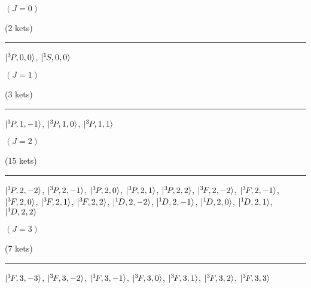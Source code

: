 \begin{mdframed}
\begin{center}
$(J=0)$

(2 kets)
\vspace{0.25cm}
\hrule
\vspace{0.25cm}
$|{}^{3}{\kern-0.1em}{P},0,0\rangle$, $|{}^{1}{\kern-0.1em}{S},0,0\rangle$
\end{center}
\end{mdframed}

\begin{mdframed}
\begin{center}
$(J=1)$

(3 kets)
\vspace{0.25cm}
\hrule
\vspace{0.25cm}
$|{}^{3}{\kern-0.1em}{P},1,-1\rangle$, $|{}^{3}{\kern-0.1em}{P},1,0\rangle$, $|{}^{3}{\kern-0.1em}{P},1,1\rangle$
\end{center}
\end{mdframed}

\begin{mdframed}
\begin{center}
$(J=2)$

(15 kets)
\vspace{0.25cm}
\hrule
\vspace{0.25cm}
$|{}^{3}{\kern-0.1em}{P},2,-2\rangle$, $|{}^{3}{\kern-0.1em}{P},2,-1\rangle$, $|{}^{3}{\kern-0.1em}{P},2,0\rangle$, $|{}^{3}{\kern-0.1em}{P},2,1\rangle$, $|{}^{3}{\kern-0.1em}{P},2,2\rangle$, $|{}^{3}{\kern-0.1em}{F},2,-2\rangle$, $|{}^{3}{\kern-0.1em}{F},2,-1\rangle$, $|{}^{3}{\kern-0.1em}{F},2,0\rangle$, $|{}^{3}{\kern-0.1em}{F},2,1\rangle$, $|{}^{3}{\kern-0.1em}{F},2,2\rangle$, $|{}^{1}{\kern-0.1em}{D},2,-2\rangle$, $|{}^{1}{\kern-0.1em}{D},2,-1\rangle$, $|{}^{1}{\kern-0.1em}{D},2,0\rangle$, $|{}^{1}{\kern-0.1em}{D},2,1\rangle$, $|{}^{1}{\kern-0.1em}{D},2,2\rangle$
\end{center}
\end{mdframed}

\begin{mdframed}
\begin{center}
$(J=3)$

(7 kets)
\vspace{0.25cm}
\hrule
\vspace{0.25cm}
$|{}^{3}{\kern-0.1em}{F},3,-3\rangle$, $|{}^{3}{\kern-0.1em}{F},3,-2\rangle$, $|{}^{3}{\kern-0.1em}{F},3,-1\rangle$, $|{}^{3}{\kern-0.1em}{F},3,0\rangle$, $|{}^{3}{\kern-0.1em}{F},3,1\rangle$, $|{}^{3}{\kern-0.1em}{F},3,2\rangle$, $|{}^{3}{\kern-0.1em}{F},3,3\rangle$
\end{center}
\end{mdframed}

